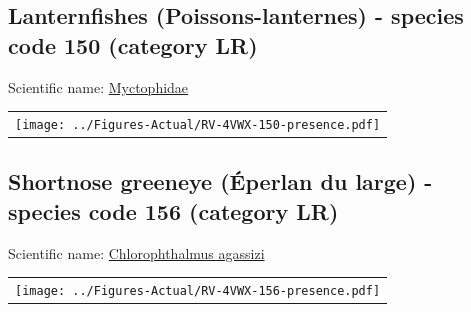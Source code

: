 \documentclass[12pt]{article}\usepackage[]{graphicx}\usepackage[]{color}
\begin{document}
\renewcommand\thefigure{\thesubsection\Alph{figure}}

\setcounter{figure}{0}

\hypertarget{sec:150}{%
\subsection{Lanternfishes (Poissons-lanternes) - species code 150 (category LR)}\label{sec:150}}

  


Scientific name: \href{http://www.marinespecies.org/aphia.php?p=taxdetails\&id=125498}{Myctophidae} \newline
\begin{minipage}{1.0\textwidth}
 \begin{tabular}{c}
\texttt{[image: ../Figures-Actual/RV-4VWX-150-presence.pdf]} \\ 
\end{tabular} 
\end{minipage}
\clearpage

\renewcommand\thefigure{\thesubsection\Alph{figure}}

\setcounter{figure}{0}

\hypertarget{sec:156}{%
\subsection{Shortnose greeneye (Éperlan du large) - species code 156 (category LR)}\label{sec:156}}

  


Scientific name: \href{http://www.marinespecies.org/aphia.php?p=taxdetails\&id=126336}{Chlorophthalmus agassizi} \newline
\begin{minipage}{1.0\textwidth}
 \begin{tabular}{c}
\texttt{[image: ../Figures-Actual/RV-4VWX-156-presence.pdf]} \\ 
\end{tabular} 
\end{minipage}
\clearpage

\renewcommand\thefigure{\thesubsection\Alph{figure}}
\end{document}
